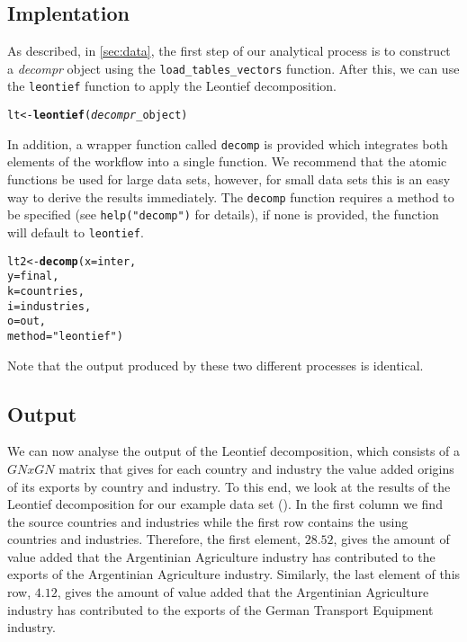 \documentclass[a4paper,11pt]{article}
\makeatletter
\newcommand{\hlstr}[1]{\textcolor[rgb]{0.192,0.494,0.8}{#1}}%
\newcommand{\hlstd}[1]{\textcolor[rgb]{0.345,0.345,0.345}{#1}}%
\newcommand{\hlkwb}[1]{\textcolor[rgb]{0.69,0.353,0.396}{#1}}%
\newcommand{\hlkwc}[1]{\textcolor[rgb]{0.333,0.667,0.333}{#1}}%
\newcommand{\hlkwd}[1]{\textcolor[rgb]{0.737,0.353,0.396}{\textbf{#1}}}%
\newenvironment{kframe}{%
 \def\at@end@of@kframe{}%
 \ifinner\ifhmode%
  \def\at@end@of@kframe{\end{minipage}}%
  \begin{minipage}{\columnwidth}%
 \fi\fi%
 \def\FrameCommand##1{\hskip\@totalleftmargin \hskip-\fboxsep
 \colorbox{shadecolor}{##1}\hskip-\fboxsep
     \hskip-\linewidth \hskip-\@totalleftmargin \hskip\columnwidth}%
 \MakeFramed {\advance\hsize-\width
   \@totalleftmargin\z@ \linewidth\hsize
   \@setminipage}}%
 {\par\unskip\endMakeFramed%
 \at@end@of@kframe}
\newenvironment{knitrout}{}{} %
\makeatother
\begin{document}
\subsection{Implentation}
As described, in \cref{sec:data}, the first step of our analytical process is to construct a \textit{decompr} object using the \verb!load_tables_vectors! function. After this, we can use the \verb!leontief! function to apply the Leontief decomposition.
\begin{knitrout}
\color{fgcolor}\begin{kframe}
\begin{alltt}
\hlstd{lt} \hlkwb{<-} \hlkwd{leontief}\hlstd{( \textit{decompr}_object )}
\end{alltt}
\end{kframe}
\end{knitrout}

In addition, a wrapper function called \verb!decomp! is provided which integrates both elements of the workflow into a single function. We recommend that the atomic functions be used for large data sets, however, for small data sets this is an easy way to derive the results immediately. The \verb!decomp! function requires a method to be specified (see \verb!help("decomp")! for details), if none is provided, the function will default to \verb!leontief!.

\begin{knitrout}
\color{fgcolor}\begin{kframe}
\begin{alltt}
\hlstd{lt2} \hlkwb{<-} \hlkwd{decomp}\hlstd{(} \hlkwc{x} \hlstd{= inter,}
               \hlkwc{y} \hlstd{= final,}
               \hlkwc{k} \hlstd{= countries,}
               \hlkwc{i} \hlstd{= industries,}
               \hlkwc{o} \hlstd{= out,}
               \hlkwc{method} \hlstd{=} \hlstr{"leontief"} \hlstd{)}
\end{alltt}
\end{kframe}
\end{knitrout}

Note that the output produced by these two different processes is identical.

\subsection{Output}
We can now analyse the output of the Leontief decomposition, which consists of a $GNxGN$ matrix that gives for each country and industry the
value added origins of its exports by country and industry.
To this end, we look at the results of the Leontief decomposition for our example data set ().
In the first column we find the source countries and industries while the first row contains the using countries and industries. Therefore, the first element, $28.52$, gives the amount of value added that the Argentinian Agriculture industry has contributed to the exports of the Argentinian Agriculture industry. Similarly, the last element of this row, $4.12$, gives the amount of value added that the Argentinian Agriculture industry has contributed 
to the exports of the German Transport Equipment industry.
\end{document}
